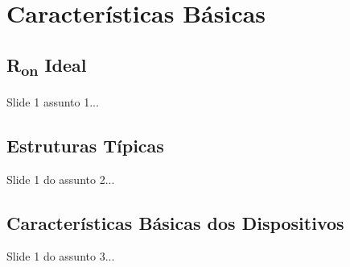 \section{Características Básicas}

\subsection{R\textsubscript{on} Ideal}

\begin{frame}

    Slide 1 assunto 1...

\end{frame}

\subsection{Estruturas Típicas}

\begin{frame}

    Slide 1 do assunto 2...

\end{frame}

\subsection{Características Básicas dos Dispositivos}

\begin{frame}

    Slide 1 do assunto 3...

\end{frame}
